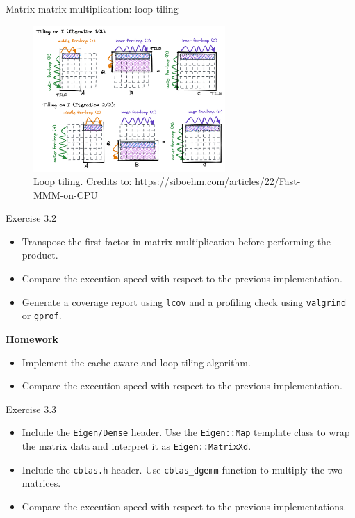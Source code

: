 \documentclass[10pt,aspectratio=169]{beamer}
\begin{document}
\begin{frame}{Matrix-matrix multiplication: loop tiling}
    \begin{figure}
        \centering
        \includegraphics[width=0.65\textwidth]{images/Tiling_on_inner.png}
        \caption{Loop tiling. Credits to: \url{https://siboehm.com/articles/22/Fast-MMM-on-CPU}}
    \end{figure}
\end{frame}

\begin{frame}{Exercise 3.2}
    \begin{itemize}
        \item Transpose the first factor in matrix multiplication before performing the product.
        \item Compare the execution speed with respect to the previous implementation.
        \item Generate a coverage report using \texttt{lcov} and a profiling check using \texttt{valgrind} or \texttt{gprof}.
    \end{itemize}
    \vspace{1cm}
    \textbf{Homework}
    \begin{itemize}
        \item Implement the cache-aware and loop-tiling algorithm.
        \item Compare the execution speed with respect to the previous implementation.
    \end{itemize}
\end{frame}

\begin{frame}{Exercise 3.3}
    \begin{itemize}
        \item Include the \texttt{Eigen/Dense} header. Use the \texttt{Eigen::Map} template class to wrap the matrix data and interpret it as \texttt{Eigen::MatrixXd}.
        \item Include the \texttt{cblas.h} header. Use \texttt{cblas\_dgemm} function to multiply the two matrices.
        \item Compare the execution speed with respect to the previous implementations.
    \end{itemize}
\end{frame}
\end{document}
